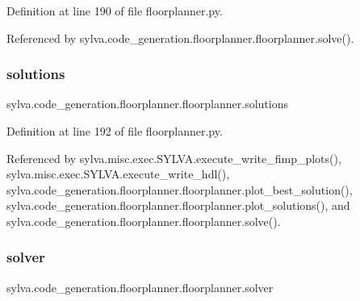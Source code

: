 Definition at line 190 of file floorplanner.\+py.



Referenced by sylva.\+code\+\_\+generation.\+floorplanner.\+floorplanner.\+solve().

\mbox{\label{classsylva_1_1code__generation_1_1floorplanner_1_1floorplanner_a4ecec4815a5e0fa5ba3f3ffb9f0697dc}} 
\subsubsection{\texorpdfstring{solutions}{solutions}}
{\footnotesize\ttfamily sylva.\+code\+\_\+generation.\+floorplanner.\+floorplanner.\+solutions}



Definition at line 192 of file floorplanner.\+py.



Referenced by sylva.\+misc.\+exec.\+S\+Y\+L\+V\+A.\+execute\+\_\+write\+\_\+fimp\+\_\+plots(), sylva.\+misc.\+exec.\+S\+Y\+L\+V\+A.\+execute\+\_\+write\+\_\+hdl(), sylva.\+code\+\_\+generation.\+floorplanner.\+floorplanner.\+plot\+\_\+best\+\_\+solution(), sylva.\+code\+\_\+generation.\+floorplanner.\+floorplanner.\+plot\+\_\+solutions(), and sylva.\+code\+\_\+generation.\+floorplanner.\+floorplanner.\+solve().

\mbox{\label{classsylva_1_1code__generation_1_1floorplanner_1_1floorplanner_af588b87074ee8449326528ea765f7bfb}} 
\subsubsection{\texorpdfstring{solver}{solver}}
{\footnotesize\ttfamily sylva.\+code\+\_\+generation.\+floorplanner.\+floorplanner.\+solver}




